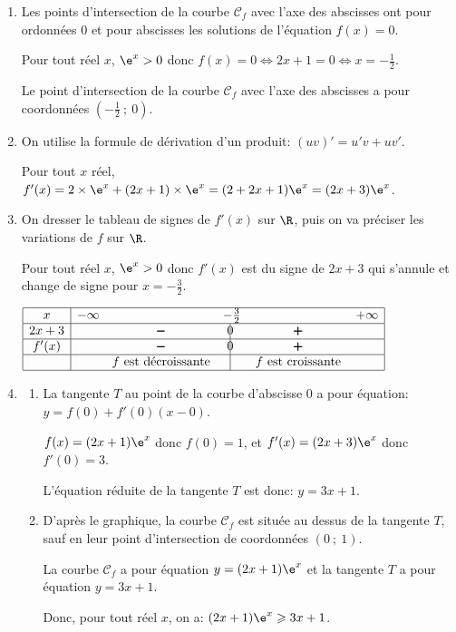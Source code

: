 \begin{enumerate}
\item  Les  points d'intersection de la courbe $\mathcal{C}_f$  avec l'axe des abscisses ont pour ordonnées 0 et pour abscisses les solutions de l'équation $f(x)=0$.

Pour tout réel $x$, $\e^{x}>0$ donc $f(x)=0 \iff 2x+1=0 \iff x = -\frac{1}{2}$.

Le point d'intersection de la courbe $\mathcal{C}_f$  avec l'axe des abscisses a pour coordonnées $\left ( -\frac{1}{2}~;~0\right )$.

\item On utilise la formule de dérivation d'un produit: $(uv)'=u'v+uv'$.

Pour tout $x$ réel,  $f'(x)= 2\times \e^{x} + (2x+1)\times \e^{x} = (2+2x+1)\e^{x} = (2x+3)\e^{x}$.

\item On dresser le tableau de signes de $f'(x)$ sur $\R$, puis on va préciser les variations de $f$ sur $\R$.

Pour tout réel $x$, $\e^{x}>0$ donc $f'(x)$ est du signe de $2x+3$ qui s'annule et change de signe pour $x=-\frac{3}{2}$.

\begin{center}
{\renewcommand{\arraystretch}{1.3}
\def\esp{\hspace*{2.5cm}}
\def\hauteur{0pt}
$\begin{array}{|c| *4{c} c|}
\hline
 x &-\infty  & \esp & -\frac{3}{2} & \esp & +\infty \\
  \hline
2x+3 &  &  \pmb{-} & \vline\hspace{-2.7pt}0 & \pmb{+} & \\  
 \hline
f'(x) &  &  \pmb{-} & \vline\hspace{-2.7pt}0 & \pmb{+} & \\  
\hline
 && f \text{ est décroissante} & \vline\hspace{-2.7pt}{\phantom 0} & f \text{ est croissante} & \\
\hline
\end{array}$
}
\end{center}

\item \begin{enumerate}
\item La tangente $T$ au point de la courbe d'abscisse 0 a pour équation:
$y=f(0)+f'(0)\left (x-0\right )$.

$f(x)=(2x+1)\e^{x}$ donc $f(0)=1$, et $f'(x)=(2x+3)\e^{x}$ donc $f'(0)=3$.

L'équation réduite de la tangente $T$ est donc: $y=3x+1$.
 
\item
D'après le graphique, la courbe $\mathcal{C}_f$ est située au dessus de la tangente $T$, sauf en leur point d'intersection de coordonnées $(0~;~1)$.

La courbe $\mathcal{C}_f$ a pour équation $y=(2x+1)\e^{x}$ et  la tangente $T$ a pour équation $y=3x+1$.

Donc, pour tout réel $x$, on a: $(2x+1)\e^{x} \geqslant 3x+1$.
\end{enumerate}
\end{enumerate}

\vspace{0,5cm}
